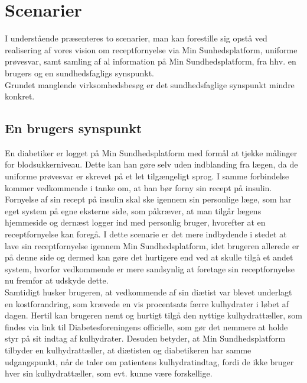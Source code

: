 \section{Scenarier} 
I understående præsenteres to scenarier, man kan forestille sig opstå ved realisering af vores vision om receptfornyelse via Min Sunhedsplatform, uniforme prøvesvar, samt samling af al information 
 på Min Sundhedsplatform, fra hhv. en brugers og en sundhedsfagligs synspunkt. \\
 Grundet manglende virksomhedsbesøg er det sundhedsfaglige synspunkt mindre konkret. 

\subsection{En brugers synspunkt}
En diabetiker er logget på Min Sundhedsplatform med formål at tjekke målinger for blodsukkerniveau. Dette kan han gøre selv uden indblanding fra lægen, da de uniforme prøvesvar er skrevet på et let tilgængeligt sprog. I samme forbindelse kommer vedkommende i tanke om, at han bør forny sin recept på insulin. Fornyelse af sin recept på insulin skal ske igennem sin personlige læge, som har eget system på egne eksterne side, som påkræver, at man tilgår lægens hjemmeside og dernæst logger ind med personlig bruger, hvorefter at en receptfornyelse kan foregå. I dette scenarie er det mere indbydende i stedet at lave sin receptfornyelse igennem Min Sundhedsplatform, idet brugeren allerede er på denne side og dermed kan gøre det hurtigere end ved at skulle tilgå et andet system, hvorfor vedkommende er mere sandsynlig at foretage sin receptfornyelse nu fremfor at udskyde dette.\\
Samtidigt husker brugeren, at vedkommende af sin diætist var blevet underlagt en kostforandring, som krævede en vis procentsats færre kulhydrater i løbet af dagen. Hertil kan brugeren nemt og hurtigt tilgå den nyttige kulhydrattæller, som findes via link til Diabetesforeningens officielle, som gør det nemmere at holde styr på sit indtag af kulhydrater. Desuden betyder, at Min Sundhedsplatform tilbyder en kulhydrattæller, at diætisten og diabetikeren har samme udgangspunkt, når de taler om patientens kulhydratindtag, fordi de ikke bruger hver sin kulhydrattæller, som evt. kunne være forskellige. 


